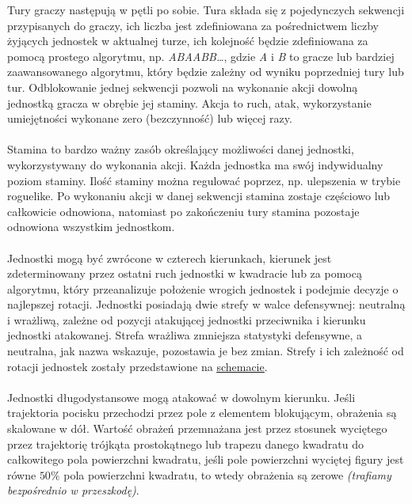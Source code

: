\documentclass[oneside]{lmdEN}%
\begin{document}
Tury graczy następują w pętli po sobie. Tura składa się z pojedynczych sekwencji przypisanych do graczy, ich liczba jest zdefiniowana za pośrednictwem liczby żyjących jednostek w aktualnej turze, ich kolejność będzie zdefiniowana za pomocą prostego algorytmu, np. \textit{ABAABB…}, gdzie \textit{A} i \textit{B} to gracze lub bardziej zaawansowanego algorytmu, który będzie zależny od wyniku poprzedniej tury lub tur. Odblokowanie jednej sekwencji pozwoli na wykonanie akcji dowolną jednostką gracza w obrębie jej staminy. Akcja to ruch, atak, wykorzystanie umiejętności wykonane zero (bezczynność) lub więcej razy. \\\\\noindent
Stamina to bardzo ważny zasób określający możliwości danej jednostki, wykorzystywany do wykonania akcji. Każda jednostka ma swój indywidualny poziom staminy. Ilość staminy można regulować poprzez, np. ulepszenia w trybie roguelike. Po wykonaniu akcji w danej sekwencji stamina zostaje częściowo lub całkowicie odnowiona, natomiast po zakończeniu tury stamina pozostaje odnowiona wszystkim jednostkom. \\\\\noindent
Jednostki mogą być zwrócone w czterech kierunkach, kierunek jest zdeterminowany przez ostatni ruch jednostki w kwadracie lub za pomocą algorytmu, który przeanalizuje położenie wrogich jednostek i podejmie decyzje o najlepszej rotacji. Jednostki posiadają dwie strefy w walce defensywnej: neutralną i wrażliwą, zależne od pozycji atakującej jednostki przeciwnika i kierunku jednostki atakowanej. Strefa wrażliwa zmniejsza statystyki defensywne, a neutralna, jak nazwa wskazuje, pozostawia je bez zmian. Strefy i ich zależność od rotacji jednostek zostały przedstawione na \hyperref[fig:unit-rotation]{\underline{schemacie}}.\\\\\noindent
Jednostki długodystansowe mogą atakować w dowolnym kierunku. Jeśli trajektoria pocisku przechodzi przez pole z elementem blokującym, obrażenia są skalowane w dół. Wartość obrażeń przemnażana jest przez stosunek wyciętego przez trajektorię trójkąta prostokątnego lub trapezu danego kwadratu do całkowitego pola powierzchni kwadratu, jeśli pole powierzchni wyciętej figury jest równe $50\%$ pola powierzchni kwadratu, to wtedy obrażenia są zerowe \textit{(trafiamy bezpośrednio w przeszkodę)}.
\end{document}
